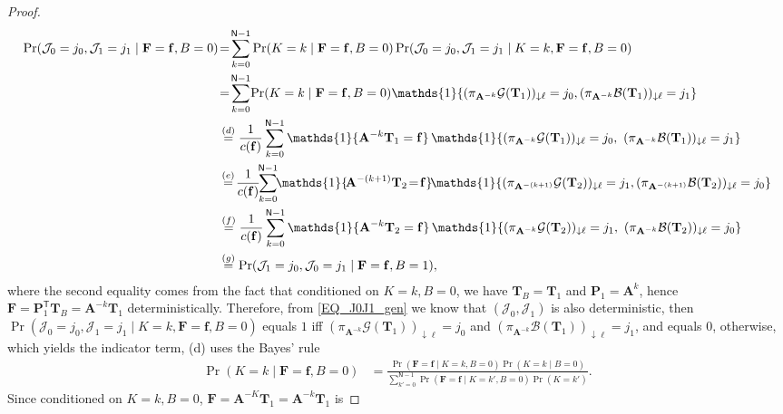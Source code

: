 \documentclass[onecolumn]{IEEEtran} %
\newcommand{\bA}{\mathbf A}
\newcommand{\bP}{\mathbf P}
\newcommand{\bF}{\mathbf F}
\newcommand{\1}{\mathbbm{1}}
\theoremstyle{boldremark}
\newcommand{\bT}{\mathbf{T}}
\begin{document}
\begin{proof}
\begin{align}
\Pr(\mathcal J_0=j_0,\mathcal J_1=j_1\mid \bF=\mathbf f,B=0)
&\!=\!\sum_{k=0}^{\textsf{N}-1}\Pr(K=k\mid \bF=\mathbf f,B=0)
        \Pr(\mathcal J_0=j_0,\mathcal J_1=j_1\mid K=k,\bF=\mathbf f,B=0)\notag\\
&\!=\!\sum_{k=0}^{\textsf{N}-1}\!\Pr(K=k\mid \bF=\mathbf f,B=0)
        \mathds{1}\!\left\{(\pi_{\bA^{-k}}\mathcal G(\bT_1))_{\downarrow\ell}=j_0,
                           (\pi_{\bA^{-k}}\mathcal B(\bT_1))_{\downarrow\ell}=j_1\right\}\notag\\
&\overset{(d)}{=}\frac{1}{c(\mathbf f)}\sum_{k=0}^{\textsf{N}-1}
   \mathds{1}\{\bA^{-k}\bT_1=\mathbf f\}\,
   \mathds{1}\!\left\{(\pi_{\bA^{-k}}\mathcal G(\bT_1))_{\downarrow\ell}=j_0,\ 
                      (\pi_{\bA^{-k}}\mathcal B(\bT_1))_{\downarrow\ell}=j_1\right\}\notag\\
&\overset{(e)}{=}\!\frac{1}{c(\mathbf f)}\!\!\sum_{k=0}^{\textsf{N}-1}\!\!
   \mathds{1}\{\!\bA^{-(k+1)}\bT_2\!=\!\mathbf f\}
   \!\mathds{1}\!\left\{(\pi_{\bA^{-(k+1)}}\mathcal G(\bT_2))_{\downarrow\ell}=j_1, 
                      (\pi_{\bA^{-(k+1)}}\mathcal B(\bT_2))_{\downarrow\ell}=j_0\right\}\notag\\
&\overset{(f)}{=}\frac{1}{c(\mathbf f)}\sum_{k=0}^{\textsf{N}-1}
   \mathds{1}\{\bA^{-k}\bT_2=\mathbf f\}\,
   \mathds{1}\!\left\{(\pi_{\bA^{-k}}\mathcal G(\bT_2))_{\downarrow\ell}=j_1,\ 
                      (\pi_{\bA^{-k}}\mathcal B(\bT_2))_{\downarrow\ell}=j_0\right\}\notag\\
&\overset{(g)}{=}\Pr(\mathcal J_1=j_0,\mathcal J_0=j_1\mid \bF=\mathbf f,B=1),
\end{align}
where the second equality comes from the fact that conditioned on $K=k,B=0$, we have $\bT_B=\bT_1$ and $\bP_1=\bA^k$, hence $\bF=\bP_1^{\mathsf T}\bT_B=\bA^{-k}\bT_1$ deterministically. Therefore, from \eqref{EQ_J0J1_gen} we know that $(\mathcal J_0,\mathcal J_1)$ is also deterministic, then
$\Pr(\mathcal J_0=j_0,\mathcal J_1=j_1\mid K=k,\bF=\mathbf f,B=0)$ equals $1$ iff
$(\pi_{\bA^{-k}}\mathcal G(\bT_1))_{\downarrow\ell}=j_0$ and
$(\pi_{\bA^{-k}}\mathcal B(\bT_1))_{\downarrow\ell}=j_1$, and equals $0$, otherwise,
which yields the indicator term, (d) uses the Bayes' rule
\begin{align}
\Pr(K=k\mid \bF=\mathbf f,B=0)
&=\frac{\Pr(\bF=\mathbf f\mid K=k,B=0)\Pr(K=k\mid B=0)}
        {\sum_{k'=0}^{\textsf{N}-1}\Pr(\bF=\mathbf f\mid K=k',B=0)\Pr(K=k')}.\label{EQ_SfB_bayes}
\end{align}
Since conditioned on $K=k,B=0$, $\bF=\bA^{-K}\bT_1=\bA^{-k}\bT_1$ is

\end{proof}
\end{document}
